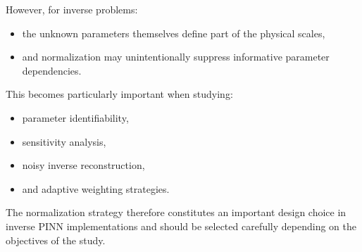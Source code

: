 However, for inverse problems:
\begin{itemize}
    \item the unknown parameters themselves define part of the physical scales,
    \item and normalization may unintentionally suppress informative parameter dependencies.
\end{itemize}

This becomes particularly important when studying:
\begin{itemize}
    \item parameter identifiability,
    \item sensitivity analysis,
    \item noisy inverse reconstruction,
    \item and adaptive weighting strategies.
\end{itemize}

The normalization strategy therefore constitutes an important design choice in inverse PINN implementations and should be selected carefully depending on the objectives of the study.